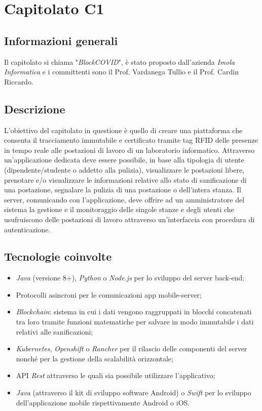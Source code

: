 \section{Capitolato C1}

\subsection{Informazioni generali}{

Il capitolato si chiama "\textit{BlockCOVID}", è stato proposto dall'azienda \textit{Imola Informatica} e i committenti sono il Prof. Vardanega Tullio e il Prof. Cardin Riccardo.
}

\subsection{Descrizione}{
L'obiettivo del capitolato in questione è quello di creare una piattaforma che consenta il tracciamento immutabile e certificato tramite tag RFID delle presenze in tempo reale alle postazioni di lavoro di un laboratorio informatico. Attraverso un'applicazione dedicata deve essere possibile, in base alla tipologia di utente (dipendente/studente o addetto alla pulizia), visualizzare le postazioni libere, prenotare e/o visualizzare le informazioni relative allo stato di sanificazione di una postazione, segnalare la pulizia di una postazione o dell'intera stanza. Il server, comunicando con l'applicazione, deve offrire ad un amministratore del sistema la gestione e il monitoraggio delle singole stanze e degli utenti che usufruiscono delle postazioni di lavoro attraverso un'interfaccia con procedura di autenticazione.

}

\subsection{Tecnologie coinvolte}{
\begin{itemize}
\item \textit{Java} (versione 8+), \textit{Python} o \textit{Node.js} per lo sviluppo del server back-end;
\item Protocolli asincroni per le comunicazioni app mobile-server;
\item \textit{Blockchain}: sistema in cui i dati vengono raggruppati in blocchi concatenati tra loro tramite funzioni matematiche per salvare in modo immutabile i dati relativi alle sanificazioni;
\item \textit{Kubernetes}, \textit{Openshift} o \textit{Rancher} per il rilascio delle componenti
del server nonché per la gestione della scalabilità orizzontale;
\item API \textit{Rest} attraverso le quali sia possibile utilizzare l'applicativo;

\item \textit{Java} (attraverso il kit di sviluppo software Android) o \textit{Swift} per lo sviluppo dell'applicazione mobile rispettivamente Android o iOS.
\end{itemize}
}

